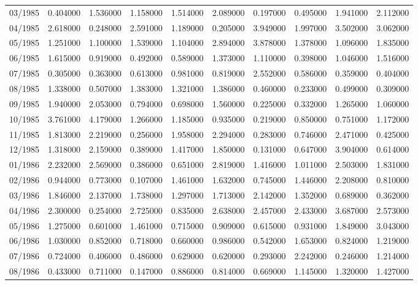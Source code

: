 \begin{tabular}{lrrrrrrrrr}
03/1985 & 0.404000 & 1.536000 & 1.158000 & 1.514000 & 2.089000 & 0.197000 & 0.495000 & 1.941000 & 2.112000 \\
04/1985 & 2.618000 & 0.248000 & 2.591000 & 1.189000 & 0.205000 & 3.949000 & 1.997000 & 3.502000 & 3.062000 \\
05/1985 & 1.251000 & 1.100000 & 1.539000 & 1.104000 & 2.894000 & 3.878000 & 1.378000 & 1.096000 & 1.835000 \\
06/1985 & 1.615000 & 0.919000 & 0.492000 & 0.589000 & 1.373000 & 1.110000 & 0.398000 & 1.046000 & 1.516000 \\
07/1985 & 0.305000 & 0.363000 & 0.613000 & 0.981000 & 0.819000 & 2.552000 & 0.586000 & 0.359000 & 0.404000 \\
08/1985 & 1.338000 & 0.507000 & 1.383000 & 1.321000 & 1.386000 & 0.460000 & 0.233000 & 0.499000 & 0.309000 \\
09/1985 & 1.940000 & 2.053000 & 0.794000 & 0.698000 & 1.560000 & 0.225000 & 0.332000 & 1.265000 & 1.060000 \\
10/1985 & 3.761000 & 4.179000 & 1.266000 & 1.185000 & 0.935000 & 0.219000 & 0.850000 & 0.751000 & 1.172000 \\
11/1985 & 1.813000 & 2.219000 & 0.256000 & 1.958000 & 2.294000 & 0.283000 & 0.746000 & 2.471000 & 0.425000 \\
12/1985 & 1.318000 & 2.159000 & 0.389000 & 1.417000 & 1.850000 & 0.131000 & 0.647000 & 3.904000 & 0.614000 \\
01/1986 & 2.232000 & 2.569000 & 0.386000 & 0.651000 & 2.819000 & 1.416000 & 1.011000 & 2.503000 & 1.831000 \\
02/1986 & 0.944000 & 0.773000 & 0.107000 & 1.461000 & 1.632000 & 0.745000 & 1.446000 & 2.208000 & 0.810000 \\
03/1986 & 1.846000 & 2.137000 & 1.738000 & 1.297000 & 1.713000 & 2.142000 & 1.352000 & 0.689000 & 0.362000 \\
04/1986 & 2.300000 & 0.254000 & 2.725000 & 0.835000 & 2.638000 & 2.457000 & 2.433000 & 3.687000 & 2.573000 \\
05/1986 & 1.275000 & 0.601000 & 1.461000 & 0.715000 & 0.909000 & 0.615000 & 0.931000 & 1.849000 & 3.043000 \\
06/1986 & 1.030000 & 0.852000 & 0.718000 & 0.660000 & 0.986000 & 0.542000 & 1.653000 & 0.824000 & 1.219000 \\
07/1986 & 0.724000 & 0.406000 & 0.486000 & 0.629000 & 0.620000 & 0.293000 & 2.242000 & 0.246000 & 1.214000 \\
08/1986 & 0.433000 & 0.711000 & 0.147000 & 0.886000 & 0.814000 & 0.669000 & 1.145000 & 1.320000 & 1.427000 \\

\end{tabular}
